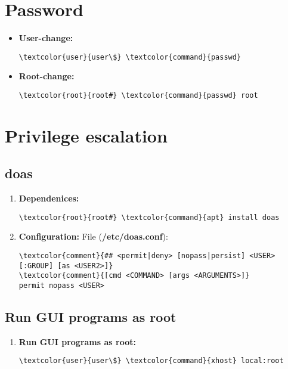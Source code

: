 \documentclass[10pt, a4paper, onecolumn, openany]{book} %
\begin{document}
\section{Password}
\begin{itemize}
    \item \textbf{User-change:}
\begin{Verbatim}[commandchars=\\\{\}]
\textcolor{user}{user\$} \textcolor{command}{passwd}
\end{Verbatim}
    \item \textbf{Root-change:}
\begin{Verbatim}[commandchars=\\\{\}]
\textcolor{root}{root#} \textcolor{command}{passwd} root
\end{Verbatim}
\end{itemize}
\section{Privilege escalation}
\subsection{doas}
\begin{enumerate}
    \item \textbf{Dependenices:}
\begin{Verbatim}[commandchars=\\\{\}]
\textcolor{root}{root#} \textcolor{command}{apt} install doas
\end{Verbatim}
    \item \textbf{Configuration:}
\newline File (\textbf{\textcolor{file}{/etc/doas.conf}}):
\begin{Verbatim}[commandchars=\\\{\}]
\textcolor{comment}{## <permit|deny> [nopass|persist] <USER>[:GROUP] [as <USER2>]}
\textcolor{comment}{[cmd <COMMAND> [args <ARGUMENTS>]}
permit nopass <USER>
\end{Verbatim}    
\end{enumerate}
\subsection{Run GUI programs as root}
\begin{enumerate}
    \item \textbf{Run GUI programs as root:}
\begin{Verbatim}[commandchars=\\\{\}]
\textcolor{user}{user\$} \textcolor{command}{xhost} local:root
\end{Verbatim}
\end{enumerate}
\end{document}
